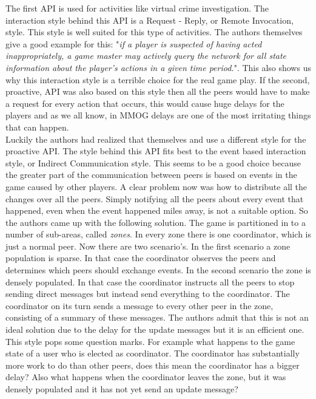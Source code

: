 The first API is used for activities like virtual crime investigation. 
The interaction style behind this API is a Request - Reply, or Remote Invocation, style. 
This style is well suited for this type of activities. 
The authors themselves give a good example for this: "\emph{if a player is suspected of having acted inappropriately, a game master may actively query the network for all state information about the player's actions in a given time period.}". 
This also shows us why this interaction style is a terrible choice for the real game play. 
If the second, proactive, API was also based on this style then all the peers would have to make a request for every action that occurs, this would cause huge delays for the players and as we all know, in MMOG delays are one of the most irritating things that can happen.\\
\indent Luckily the authors had realized that themselves and use a different style for the proactive API.
The style behind this API fits best to the event based interaction style, or Indirect Communication style. 
This seems to be a good choice because the greater part of the communication between peers is based on events in the game caused by other players. 
A clear problem now was how to distribute all the changes over all the peers. 
Simply notifying all the peers about every event that happened, even when the event happened miles away, is not a suitable option. 
So the authors came up with the following solution. 
The game is partitioned in to a number of sub-areas, called \emph{zones}. 
In every zone there is one coordinator, which is just a normal peer. 
Now there are two scenario's. In the first scenario a zone population is sparse. 
In that case the coordinator observes the peers and determines which peers should exchange events. 
In the second scenario the zone is densely populated. 
In that case the coordinator instructs all the peers to stop sending direct messages but instead send everything to the coordinator. 
The coordinator on its turn sends a message to every other peer in the zone, consisting of a summary of these messages. 
The authors admit that this is not an ideal solution due to the delay for the update messages but it is an efficient one.\\ 
\indent This style pops some question marks. 
For example what happens to the game state of a user who is elected as coordinator. 
The coordinator has substantially more work to do than other peers, does this mean the coordinator has a bigger delay? 
Also what happens when the coordinator leaves the zone, but it was densely populated and it has not yet send an update message? 
